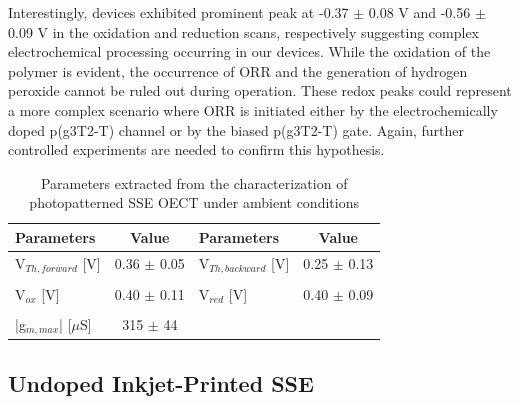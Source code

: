 Interestingly, devices exhibited prominent peak at -0.37 $\pm$ 0.08 V and -0.56 $\pm$ 0.09 V in the oxidation and reduction scans, respectively suggesting complex electrochemical processing occurring in our devices. While the oxidation of the polymer is evident, the occurrence of ORR and the generation of hydrogen peroxide cannot be ruled out during operation. These redox peaks could represent a more complex scenario where ORR is initiated either by the electrochemically doped p(g3T2-T) channel or by the biased p(g3T2-T) gate. Again, further controlled experiments are needed to confirm this hypothesis.


\begin{table}[ht]
\centering
\caption{Parameters extracted from the characterization of photopatterned SSE OECT under ambient conditions}
\begin{tabular}{l|c||l|c}
Parameters & Value & Parameters & Value \\\hline \hline
V$_{Th,forward}$ [V] & 0.36 $\pm$ 0.05 & V$_{Th,backward}$ [V] & 0.25 $\pm$ 0.13 \\
& & &\\[-1em]
V$_{ox}$ [V] & 0.40 $\pm$ 0.11 & V$_{red}$ [V] & 0.40 $\pm$ 0.09 \\
& & &\\[-1em]
|g$_{m,max}$| [$\mu$S] & 315 $\pm$ 44 &  &\\\hline
\end{tabular}
\label{tab:photofom_amb}
\end{table}

\subsection{Undoped Inkjet-Printed SSE}%

